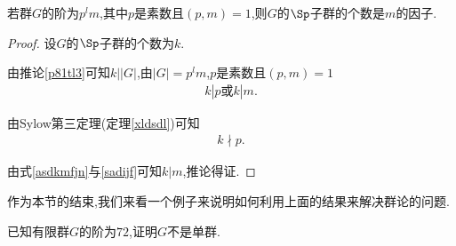 \begin{corollary}\label{p82tl}
    若群$G$的阶为$p^lm$,其中$p$是素数且$(p,m)=1$,则$G$的$\Sp$子群的个数是$m$的因子.
\end{corollary}
\begin{proof}
    设$G$的$\Sp$子群的个数为$k$.

    由推论\ref{p81tl3}可知$k\Big||G|$,由$|G|=p^lm$,$p$是素数且$(p,m)=1$\begin{align}\label{asdkmfjn}
        k|p\text{或}k|m.
    \end{align}

    由Sylow第三定理(定理\ref{xldsdl})可知\begin{align}\label{sadijf}
        k\nmid p.
    \end{align}

    由式\eqref{asdkmfjn}与\eqref{sadijf}可知$k|m$,推论得证.
\end{proof}
作为本节的结束,我们来看一个例子来说明如何利用上面的结果来解决群论的问题.
\begin{example}
    已知有限群$G$的阶为$72$,证明$G$不是单群.
\end{example}
